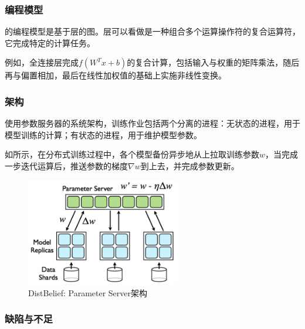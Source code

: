 \subsubsection{编程模型}

\begin{content}

的编程模型是基于层的图。层可以看做是一种组合多个运算操作符的复合运算符，它完成特定的计算任务。

例如，全连接层完成$f({W^T}x + b)$的复合计算，包括输入与权重的矩阵乘法，随后再与偏置相加，最后在线性加权值的基础上实施非线性变换。

\end{content}

\subsubsection{架构}

\begin{content}

使用参数服务器的系统架构，训练作业包括两个分离的进程：无状态的进程，用于模型训练的计算；有状态的进程，用于维护模型参数。

如所示，在分布式训练过程中，各个模型备份异步地从上拉取训练参数$w$，当完成一步迭代运算后，推送参数的梯度$ \nabla w $到上去，并完成参数更新。

\begin{figure}[!htbp]
\centering
\includegraphics[width=0.6\textwidth]{figures/parameter-server.png}
\caption{DistBelief: Parameter Server架构}
 \label{fig:parameter-server}
\end{figure}

\end{content}

\subsubsection{缺陷与不足}

